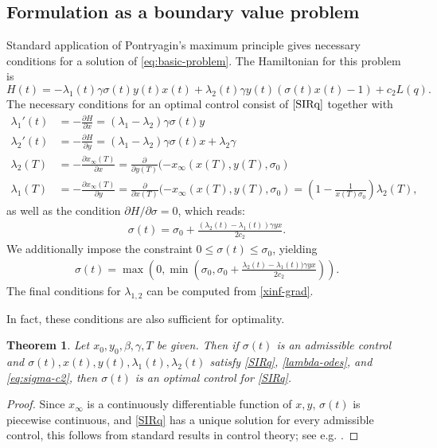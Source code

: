 \documentclass[english,12pt,letter]{article}
\newtheorem{thm}{Theorem}
\newcommand{\Sinf}{x_\infty}
\begin{document}
\subsection{Formulation as a boundary value problem}
Standard application of Pontryagin's maximum principle gives necessary conditions
for a solution of \eqref{eq:basic-problem}.  The Hamiltonian for this problem is
$$
    H(t) = -\lambda_1(t) \gamma \sigma(t) y(t) x(t) + \lambda_2(t)\gamma y(t)(\sigma(t) x(t) - 1) + c_2 L(q).
$$
The necessary conditions for an optimal control consist of $\eqref{SIRq}$ together with
\begin{subequations}\label{lambda-odes}
\begin{align} 
    \lambda_1'(t) & = -\frac{\partial H}{\partial x} = (\lambda_1-\lambda_2)\gamma\sigma(t) y \\
    \lambda_2'(t) & = -\frac{\partial H}{\partial y} = (\lambda_1-\lambda_2)\gamma\sigma(t) x + \lambda_2 \gamma \\
    \lambda_2(T) & = -\frac{\partial \Sinf(T)}{\partial x} = \frac{\partial }{\partial y(T)} (-x_\infty(x(T),y(T),\sigma_0) \\
    \lambda_1(T) & = -\frac{\partial \Sinf(T)}{\partial y} =\frac{\partial }{\partial x(T)} (-x_\infty(x(T),y(T),\sigma_0) = \left(1-\frac{1}{x(T)\sigma_0}\right)\lambda_2(T),
\end{align}
\end{subequations}
as well as the condition $\partial H/\partial \sigma = 0$, which reads:
\begin{align*}
    \sigma(t) = \sigma_0 + \frac{(\lambda_2(t)-\lambda_1(t))\gamma y x}{2c_2}.
\end{align*}
We additionally impose the constraint $0\le \sigma(t) \le \sigma_0$, yielding
\begin{align} \label{eq:sigma-c2}
    \sigma(t) = \max\left(0,\min\left(\sigma_0,\sigma_0 + \frac{\lambda_2(t)-\lambda_1(t))\gamma y x}{2c_2}\right)\right).
\end{align}
The final conditions for $\lambda_{1,2}$ can be computed from \eqref{xinf-grad}.

In fact, these conditions are also sufficient for optimality.
\begin{thm}
    Let $x_0, y_0, \beta, \gamma, T$ be given.  Then if $\sigma(t)$ is an admissible control and
    $\sigma(t), x(t), y(t), \lambda_1(t), \lambda_2(t)$ satisfy \eqref{SIRq}, \eqref{lambda-odes},
    and \eqref{eq:sigma-c2}, then $\sigma(t)$ is an optimal control for \eqref{SIRq}.
\end{thm}
\begin{proof}
    Since $\Sinf$ is a continuously differentiable function of $x, y$, $\sigma(t)$ is piecewise
    continuous, and \eqref{SIRq} has a unique solution for every admissible control,
    this follows from standard results in control theory; see e.g. \cite[Thm. 3.4.1]{speyer2010primer}.
\end{proof}
\end{document}

